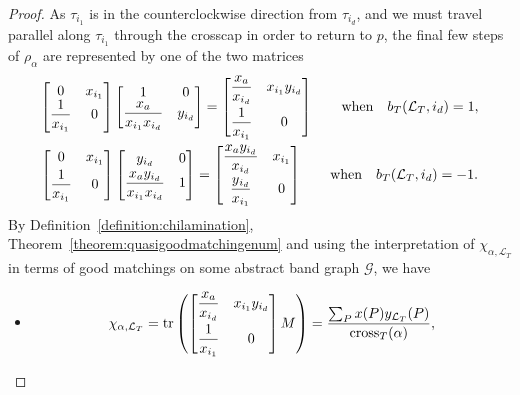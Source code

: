 \documentclass[10pt,a4paper]{amsart}
\numberwithin{equation}{section}
\theoremstyle{definition}
\begin{document}
\begin{proof}
As $\tau_{i_1}$ is in the counterclockwise direction from $\tau_{i_{d}}$, and we must travel parallel along $\tau_{i_1}$ through the crosscap in order to return to $p$, the final few steps of $\rho_{\alpha}$ are represented by one of the two matrices
\begin{gather}
\begin{bmatrix}
0 & x_{i_1}\\
\dfrac{1}{x_{i_1}} & 0
\end{bmatrix}
\begin{bmatrix}
1 & 0\\
\dfrac{x_{a}}{x_{i_1}x_{i_d}} & y_{i_d}
\end{bmatrix}=\begin{bmatrix}
\dfrac{x_a}{x_{i_d}} & x_{i_1}y_{i_d}\vspace{1mm}\\
\dfrac{1}{x_{i_1}} & 0
\end{bmatrix}\qquad\text{when}\quad b_T(\mathcal{L}_T, i_d)=1, \label{eqn:finalstep1}\\
\begin{bmatrix}
0 & x_{i_1}\vspace{1mm}\\
\dfrac{1}{x_{i_1}} & 0
\end{bmatrix}
\begin{bmatrix}
y_{i_d} & 0\vspace{1mm}\\
\dfrac{x_{a}y_{i_d}}{x_{i_1}x_{i_d}} & 1
\end{bmatrix}=\begin{bmatrix}
\dfrac{x_ay_{i_d}}{x_{i_d}} & x_{i_1}\vspace{1mm}\\
\dfrac{y{_{i_d}}}{x_{i_1}} & 0
\end{bmatrix}\qquad\text{when}\quad b_T(\mathcal{L}_T, i_d)=-1. \label{eqn:finalstep2}
\end{gather}
By Definition~\ref{definition:chilamination}, Theorem~\ref{theorem:quasigoodmatchingenum} and using the interpretation of $\chi_{\alpha, \mathcal{L}_T}$ in terms of good matchings on some abstract band graph $\mathcal{G}$, we have
\begin{itemize}\itemsep=0pt
\item
\[
\chi_{\alpha, \mathcal{L}_T}=\operatorname{tr}\left(\begin{bmatrix}
\dfrac{x_a}{x_{i_d}} & x_{i_1}y_{i_d}\vspace{1mm}\\
\dfrac{1}{x_{i_1}} & 0
\end{bmatrix}M\right)=\frac{\sum_P x(P)y_{\mathcal{L}_T}(P)}{\operatorname{cross}_T(\alpha)},\]

\end{itemize}
\end{proof}
\end{document}
